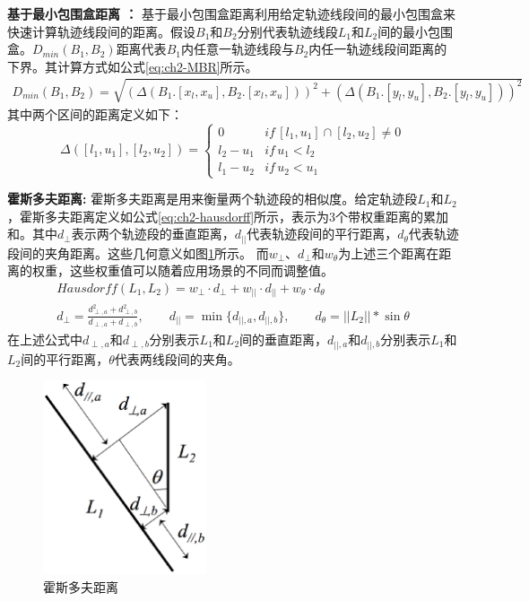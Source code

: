 \textbf{基于最小包围盒距离 ：}
基于最小包围盒距离利用给定轨迹线段间的最小包围盒来快速计算轨迹线段间的距离。假设$B_{1}$和$B_{2}$分别代表轨迹线段$L_{1}$和$L_{2}$间的最小包围盒。$D_{min}(B_{1},B_{2})$距离代表$B_{1}$内任意一轨迹线段与$B_{2}$内任一轨迹线段间距离的下界。其计算方式如公式\ref{eq:ch2-MBR}所示。
\begin{eqnarray}\label{eq:ch2-MBR}
D_{min}(B_{1},B_{2})=\sqrt{(\Delta(B_{1}.[x_{l}, x_{u}], B_{2}.[x_{l},x_{u}])  )^2+(\Delta(B_{1}.[y_{l}, y_{u}], B_{2}.[y_{l},y_{u}]) )^2 }
\end{eqnarray}
其中两个区间的距离定义如下：
\begin{equation}\label{eq:ch2-DisInternal}
\Delta([l_{1}, u_{1}], [l_{2},u_{2}]) =\begin{cases}
0 & if \, [l_{1}, u_{1}] \cap [l_{2},u_{2}] \neq 0   \\
l_{2}-u_{1} & if \, u_{1} < l_{2}   \\
l_{1}-u_{2} & if \, u_2 < u_{1}
\end{cases}
\end{equation}

\textbf{霍斯多夫距离:}
霍斯多夫距离是用来衡量两个轨迹段的相似度。给定轨迹段$L_{1}$和$L_{2}$，霍斯多夫距离定义如公式\ref{eq:ch2-hausdorff}所示，表示为3个带权重距离的累加和。其中$d_{\perp}$表示两个轨迹段的垂直距离，$d_{||}$代表轨迹段间的平行距离，$d_{\theta}$代表轨迹段间的夹角距离。这些几何意义如图\ref{fig-chapter2-Hausdorff}所示。
而$w_{\perp}$、$ d_{\perp}$和$w_{\theta}$为上述三个距离在距离的权重，这些权重值可以随着应用场景的不同而调整值。
\begin{eqnarray}\label{eq:ch2-hausdorff}
Hausdorff(L_{1},L_{2})=w_{\perp} \cdot d_{\perp} + w_{||}\cdot d_{||} +w_{\theta} \cdot d_{\theta} \nonumber \\
d_{\perp} =\frac{d_{\perp,a}^2 + d_{\perp,b} ^2}{d_{\perp,a} +d_{\perp,b}}, \qquad d_{||}=\min\{d_{||,a}, d_{||,b}\},\qquad d_{\theta}=||L_{2}||*\sin{\theta}
\end{eqnarray}
在上述公式中$d_{\perp,a}$和$d_{\perp,b}$分别表示$L_{1}$和$L_{2}$间的垂直距离，$d_{||,a}$和$d_{||,b}$分别表示$L_{1}$和$L_{2}$间的平行距离，$\theta$代表两线段间的夹角。


\begin{figure}
	\centering
	\includegraphics[width=0.43\textwidth]{Fig/chapter2/Hausdorff}
	\caption{霍斯多夫距离}
	\label{fig-chapter2-Hausdorff}
\end{figure}

